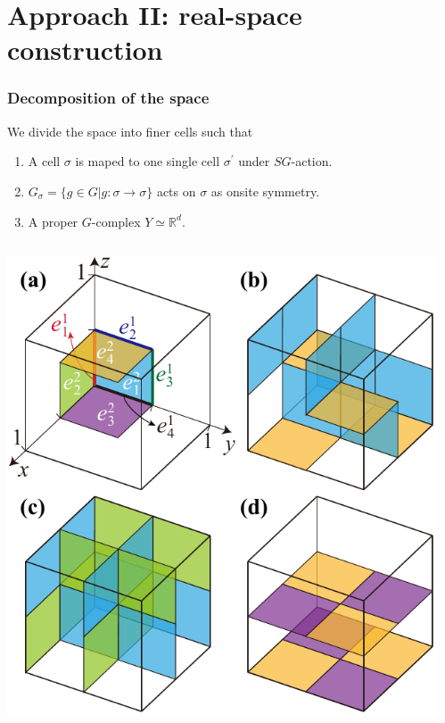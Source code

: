 \documentclass[xcolor=table, 11pt, aspectratio=1610]{beamer}
\begin{document}
\section{Approach II: real-space construction}
\begin{frame}
	\frametitle{Decomposition of the space}
	We divide the space into finer cells such that
	\begin{enumerate}
		\item A cell $\sigma$ is maped to one single cell $\sigma^\prime$ under $SG$-action.
		\item $G_\sigma=\{g\in G|g:\sigma\rightarrow\sigma\}$ acts on $\sigma$ as onsite symmetry.
		\item A proper $G$-complex $Y\simeq \mathbb R^d$.
	\end{enumerate}
	\begin{columns}
		\begin{center}
			\includegraphics[width=.5\textwidth]{../spspt/blocks}
		\end{center}
		\begin{center}
		\end{center}
	\end{columns}
\end{frame}
\end{document}
